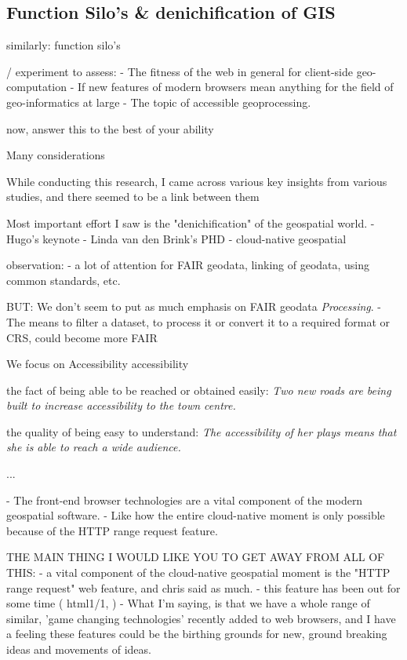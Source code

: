 \subsection*{Function Silo's \& denichification of GIS}

similarly: function silo's 

/ experiment to assess: 
- The fitness of the web in general for client-side geo-computation
- If new features of modern browsers mean anything for the field of geo-informatics at large 
- The topic of accessible geoprocessing.

now, answer this to the best of your ability

Many considerations


While conducting this research, I came across various key insights from various studies, and there seemed to be a link between them 

Most important effort I saw is the "denichification" of the geospatial world.
- Hugo's keynote
- Linda van den Brink's PHD
- cloud-native geospatial 

observation: 
- a lot of attention for FAIR geodata, linking of geodata, using common standards, etc. 

BUT: We don't seem to put as much emphasis on FAIR geodata \emph{Processing}. 
- The means to filter a dataset, to process it or convert it to a required format or CRS, could become more FAIR

We focus on Accessibility
accessibility

\m{->} the fact of being able to be reached or obtained easily:
\textit{Two new roads are being built to increase accessibility to the town centre.}

\m{->} the quality of being easy to understand: 
\textit{The accessibility of her plays means that she is able to reach a wide audience.}

...

- The front-end browser technologies are a vital component of the modern geospatial software.
- Like how the entire cloud-native moment is only possible because of the HTTP range request feature. 


THE MAIN THING I WOULD LIKE YOU TO GET AWAY FROM ALL OF THIS:
- a vital component of the cloud-native geospatial moment is the "HTTP range request" web feature, and chris said as much.
  - this feature has been out for some time ( html1/1, )
- What I'm saying, is that we have a whole range of similar, 'game changing technologies' recently added to web browsers, and I have a feeling these features could be the birthing grounds for new, ground breaking ideas and movements of ideas. 

